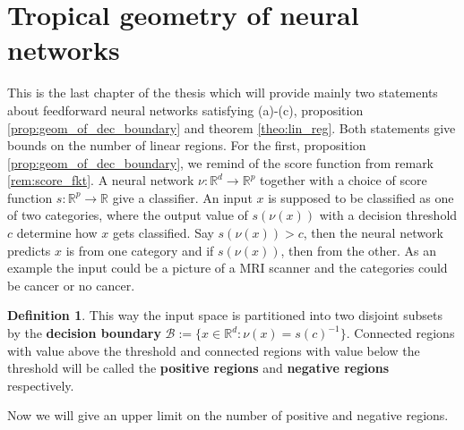 \documentclass{article}
\theoremstyle{definition}
\newtheorem{definition}[theorem]{Definition}
\begin{document}
\newpage

\section{Tropical geometry of neural networks}
\label{sec:tropical_geometry_of_neural_networks}

This is the last chapter of the thesis which will provide mainly two statements about feedforward neural networks satisfying (a)-(c), proposition \ref{prop:geom_of_dec_boundary} and theorem \ref{theo:lin_reg}. Both statements give bounds on the number of linear regions. For the first, proposition \ref{prop:geom_of_dec_boundary}, we remind of the score function from remark \ref{rem:score_fkt}. A neural network $\nu : \mathbb{R}^{d} \to \mathbb{R}^{p}$ together with a choice of score function $s : \mathbb{R}^{p} \to \mathbb{R}$ give a classifier. An input $x$ is supposed to be classified as one of two categories, where the output value of $s(\nu(x))$ with a decision threshold $c$ determine how $x$ gets classified. Say $s(\nu(x))>c$, then the neural network predicts $x$ is from one category and if $s(\nu(x))$, then from the other. As an example the input could be a picture of a MRI scanner and the categories could be cancer or no cancer.

\begin{definition}\hspace{1sp}\cite{zhang2018tropical}
This way the input space is partitioned into two disjoint subsets by the
\textbf{decision boundary} $\mathcal{B} := \{ x \in \mathbb{R}^{d}: \nu(x)=s(c)^{-1} \}$. Connected regions with value above the threshold and connected
regions with value below the threshold will be called the
\textbf{positive regions} and \textbf{negative regions} respectively.
\end{definition}

Now we will give an upper limit on the number of positive and negative regions.
\end{document}
